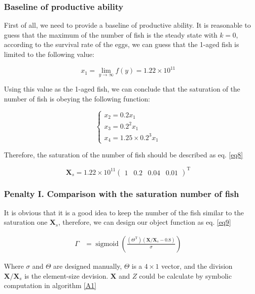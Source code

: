 \documentclass{IEEEtran}
\DeclareMathOperator*{\sigmoid}{sigmoid}
\begin{document}
\subsubsection{Baseline of productive ability}

First of all, we need to provide a baseline of productive ability. It is reasonable to guess that the maximum of the number of fish is the steady state with $k = 0$, according to the survival rate of the eggs, we can guess that the 1-aged fish is limited to the following value:

\begin{equation}
    x_1 = \lim_{y\to\infty} f(y) = 1.22 \times 10^{11}
\end{equation}

Using this value as the 1-aged fish, we can conclude that the saturation of the number of fish is obeying the following function:

\begin{equation}
    \begin{cases}
        x_2 = 0.2 x_1\\
        x_3 = 0.2^2 x_1\\
        x_4 = 1.25 \times 0.2^3 x_1
    \end{cases}
\end{equation}

Therefore, the saturation of the number of fish should be described as eq. \ref{eq8}

\begin{equation}
    \label{eq8}
    \bm X_s = 1.22 \times 10^{11}\begin{pmatrix}1 & 0.2 & 0.04 & 0.01\end{pmatrix}^\mathrm T
\end{equation}

\subsubsection{Penalty I. Comparison with the saturation number of fish}

It is obvious that it is a good idea to keep the number of the fish similar to the saturation one $\bm X_s$, therefore, we can design our object function as eq. \ref{eq9}

\begin{align}
    \label{eq9}
    \Gamma &= \sigmoid(\frac{(\Theta^\mathrm T)(\bm X / \bm X_s - 0.8)}{\sigma})
\end{align}

Where $\sigma$ and $\Theta$ are designed manually, $\Theta$ is a $4 \times 1$ vector, and the division $\bm X / \bm X_s$ is the element-size devision. $\bm X$ and $Z$ could be calculate by symbolic computation in algorithm \ref{A1}
\end{document}

